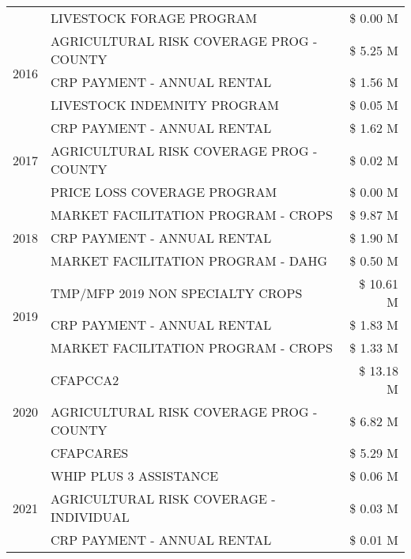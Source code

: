 \begin{tabular}{llr}
 & LIVESTOCK FORAGE PROGRAM & \$ 0.00 M \\
\cline{1-3}
\multirow[t]{3}{*}{2016} & AGRICULTURAL RISK COVERAGE PROG - COUNTY & \$ 5.25 M \\
 & CRP PAYMENT - ANNUAL RENTAL & \$ 1.56 M \\
 & LIVESTOCK INDEMNITY PROGRAM & \$ 0.05 M \\
\cline{1-3}
\multirow[t]{3}{*}{2017} & CRP PAYMENT - ANNUAL RENTAL & \$ 1.62 M \\
 & AGRICULTURAL RISK COVERAGE PROG - COUNTY & \$ 0.02 M \\
 & PRICE LOSS COVERAGE PROGRAM & \$ 0.00 M \\
\cline{1-3}
\multirow[t]{3}{*}{2018} & MARKET FACILITATION PROGRAM - CROPS & \$ 9.87 M \\
 & CRP PAYMENT - ANNUAL RENTAL & \$ 1.90 M \\
 & MARKET FACILITATION PROGRAM - DAHG & \$ 0.50 M \\
\cline{1-3}
\multirow[t]{3}{*}{2019} & TMP/MFP 2019 NON SPECIALTY CROPS & \$ 10.61 M \\
 & CRP PAYMENT - ANNUAL RENTAL & \$ 1.83 M \\
 & MARKET FACILITATION PROGRAM - CROPS & \$ 1.33 M \\
\cline{1-3}
\multirow[t]{3}{*}{2020} & CFAPCCA2 & \$ 13.18 M \\
 & AGRICULTURAL RISK COVERAGE PROG - COUNTY & \$ 6.82 M \\
 & CFAPCARES & \$ 5.29 M \\
\cline{1-3}
\multirow[t]{3}{*}{2021} & WHIP PLUS 3 ASSISTANCE & \$ 0.06 M \\
 & AGRICULTURAL RISK COVERAGE - INDIVIDUAL & \$ 0.03 M \\
 & CRP PAYMENT - ANNUAL RENTAL & \$ 0.01 M \\
\cline{1-3}
\bottomrule
\end{tabular}
